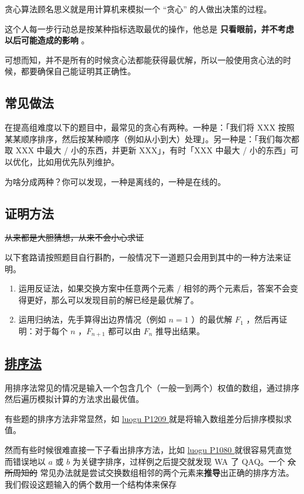 
贪心算法顾名思义就是用计算机来模拟一个 “贪心” 的人做出决策的过程。

这个人每一步行动总是按某种指标选取最优的操作，他总是 \textbf{ 只看眼前，并不考虑以后可能造成的影响 } 。

可想而知，并不是所有的时候贪心法都能获得最优解，所以一般使用贪心法的时候，都要确保自己能证明其正确性。

\subsection{常见做法}

在提高组难度以下的题目中，最常见的贪心有两种。一种是：「我们将 XXX 按照某某顺序排序，然后按某种顺序（例如从小到大）处理」。另一种是：「我们每次都取 XXX 中最大 / 小的东西，并更新 XXX」，有时「XXX 中最大 / 小的东西」可以优化，比如用优先队列维护。

为啥分成两种？你可以发现，一种是离线的，一种是在线的。

\subsection{证明方法}

\st{从来都是大胆猜想，从来不会小心求证}

以下套路请按照题目自行斟酌，一般情况下一道题只会用到其中的一种方法来证明。

\begin{enumerate}
\item 运用反证法，如果交换方案中任意两个元素 / 相邻的两个元素后，答案不会变得更好，那么可以发现目前的解已经是最优解了。
\item 运用归纳法，先手算得出边界情况（例如 $n = 1$ ）的最优解 $F_1$ ，然后再证明：对于每个 $n$ ，$F_{n+1}$ 都可以由 $F_{n}$ 推导出结果。
\end{enumerate}

\subsection{\href{https://goldimax.github.io/atricle.html?5b82a0a49f54540031c06bd8}{排序法}}

用排序法常见的情况是输入一个包含几个（一般一到两个）权值的数组，通过排序然后遍历模拟计算的方法求出最优值。

有些题的排序方法非常显然，如 \href{https://www.luogu.org/problemnew/show/P1209}{ luogu P1209 } 就是将输入数组差分后排序模拟求值。

然而有些时候很难直接一下子看出排序方法，比如 \href{https://www.luogu.org/problemnew/show/P1080}{ luogu P1080 } 就很容易凭直觉而错误地以 $a$ 或 $b$ 为关键字排序，过样例之后提交就发现 WA 了 QAQ。一个 \st{众所周知的} 常见办法就是尝试交换数组相邻的两个元素来\textbf{推导}出正确的排序方法。我们假设这题输入的俩个数用一个结构体来保存


